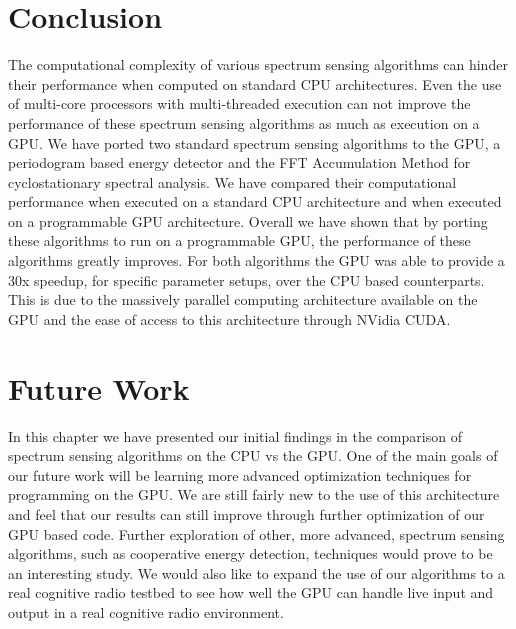 \section{Conclusion}
\label{sect:gpu_conclusion}
The computational complexity of various spectrum sensing algorithms can hinder their performance when computed on standard CPU architectures.  Even the use of multi-core processors with multi-threaded execution can not improve the performance of these spectrum sensing algorithms as much as execution on a GPU.  We have ported two standard spectrum sensing algorithms to the GPU, a periodogram based energy detector and the FFT Accumulation Method for cyclostationary spectral analysis.  We have compared their computational performance  when executed on a standard CPU architecture and when executed on a programmable GPU architecture.  Overall we have shown that by porting these algorithms to run on a programmable GPU, the performance of these algorithms greatly improves.  For both algorithms the GPU was able to provide a 30x speedup, for specific parameter setups, over the CPU based counterparts.  This is due to the massively parallel computing architecture available on the GPU and the ease of access to this architecture through NVidia CUDA.


\section{Future Work}
\label{sect:gpu_future_work}
In this chapter we have presented our initial findings in the comparison of spectrum sensing algorithms on the CPU vs the GPU.  One of the main goals of our future work will be learning more advanced optimization techniques for programming on the GPU.  We are still fairly new to the use of this architecture and feel that our results can still improve through further optimization of our GPU based code.
Further exploration of other, more advanced, spectrum sensing algorithms, such as cooperative energy detection, techniques would prove to be an interesting study.  We would also like to expand the use of our algorithms to a real cognitive radio testbed to see how well the GPU can handle live input and output in a real cognitive radio environment.
